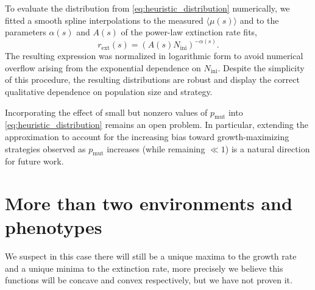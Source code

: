 \documentclass[a4paper,10pt,twocolumn]{article}
\begin{document}
To evaluate the distribution from \autoref{eq:heuristic_distribution} numerically, we fitted a smooth spline interpolations to the measured $\langle\mu(s)\rangle$ and to the parameters $\alpha(s)$ and $A(s)$ of the power-law extinction rate fits,
\begin{equation}
    r_{\mathrm{ext}}(s) = (A(s)N_\text{ini})^{-\alpha(s)}.
\end{equation}
The resulting expression was normalized in logarithmic form to avoid numerical overflow arising from the exponential dependence on $N_\text{ini}$. Despite the simplicity of this procedure, the resulting distributions are robust and display the correct qualitative dependence on population size and strategy.

Incorporating the effect of small but nonzero values of $p_{\text{mut}}$ into \autoref{eq:heuristic_distribution} remains an open problem. In particular, extending the approximation to account for the increasing bias toward growth-maximizing strategies observed as $p_{\text{mut}}$ increases (while remaining $\ll 1$) is a natural direction for future work.

\section{More than two environments and phenotypes}

We suspect in this case there will still be a unique maxima to the growth rate and a unique minima to the extinction rate, more precisely we believe this functions will be concave and convex respectively, but we have not proven it.
\end{document}
